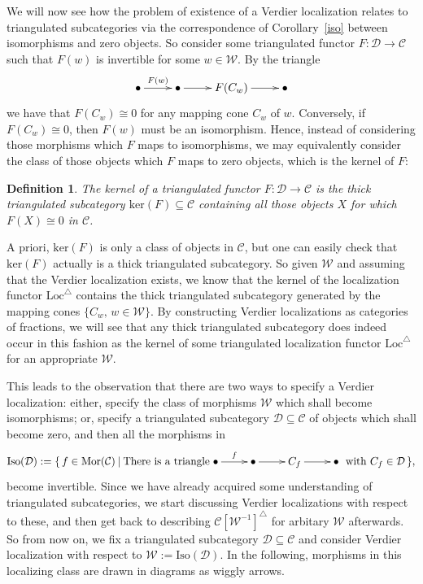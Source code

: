 \documentclass{amsproc}
\newtheorem{defn}[prop]{Definition}
\theoremstyle{definition}
\begin{document}
We will now see how the problem of existence of a Verdier localization relates to triangulated subcategories via the correspondence of Corollary~\ref{iso} between isomorphisms and zero objects. So consider some triangulated functor $F:{\mathcal{D}}{\longrightarrow}{\mathcal{C}}$ such that $F(w)$ is invertible for some $w\in{\mathcal{W}}$. By the triangle
\begin{displaymath}
\xymatrix{{\bullet}\ar[r]^{F(w)} & {\bullet}\ar[r] & F(C_w)\ar[r] & {\bullet}}
\end{displaymath}
we have that $F(C_w)\cong 0$ for any mapping cone $C_w$ of $w$. Conversely, if $F(C_w)\cong 0$, then $F(w)$ must be an isomorphism. Hence, instead of considering those morphisms which $F$ maps to isomorphisms, we may equivalently consider the class of those objects which $F$ maps to zero objects, which is the kernel of $F$:

\begin{defn}
The \emph{kernel of a triangulated functor} $F:{\mathcal{D}}{\longrightarrow}{\mathcal{C}}$ is the thick triangulated subcategory $\mathrm{ker}(F)\subseteq{\mathcal{C}}$ containing all those objects $X$ for which $F(X)\cong 0$ in ${\mathcal{C}}$.
\end{defn}

A priori, $\mathrm{ker}(F)$ is only a class of objects in ${\mathcal{C}}$, but one can easily check that $\mathrm{ker}(F)$ actually is a thick triangulated subcategory. So given ${\mathcal{W}}$ and assuming that the Verdier localization exists, we know that the kernel of the localization functor ${\mathrm{Loc}}^\triangle$ contains the thick triangulated subcategory generated by the mapping cones $\{C_w,\,w\in{\mathcal{W}}\}$. By constructing Verdier localizations as categories of fractions, we will see that any thick triangulated subcategory does indeed occur in this fashion as the kernel of some triangulated localization functor ${\mathrm{Loc}}^\triangle$ for an appropriate ${\mathcal{W}}$.

This leads to the observation that there are two ways to specify a Verdier localization: either, specify the class of morphisms ${\mathcal{W}}$ which shall become isomorphisms; or, specify a triangulated subcategory ${\mathcal{D}}\subseteq{\mathcal{C}}$ of objects which shall become zero, and then all the morphisms in
\begin{displaymath}
{\mathrm{Iso}}({\mathcal{D}}):=\{\, f\in{\mathrm{Mor}}({\mathcal{C}})\:|\:\textrm{There is a triangle}\xymatrix{{\bullet}\ar[r]^f & {\bullet}\ar[r] & C_f\ar[r] & {\bullet}}\textrm{ with } C_f\in{\mathcal{D}}\,\},
\end{displaymath}
become invertible. Since we have already acquired some understanding of triangulated subcategories, we start discussing Verdier localizations with respect to these, and then get back to describing ${\mathcal{C}}[{\mathcal{W}}^{-1}]^\triangle$ for arbitary ${\mathcal{W}}$ afterwards. So from now on, we fix a triangulated subcategory ${\mathcal{D}}\subseteq{\mathcal{C}}$ and consider Verdier localization with respect to ${\mathcal{W}}:={\mathrm{Iso}}({\mathcal{D}})$. In the following, morphisms in this localizing class are drawn in diagrams as wiggly arrows. 
\end{document}
